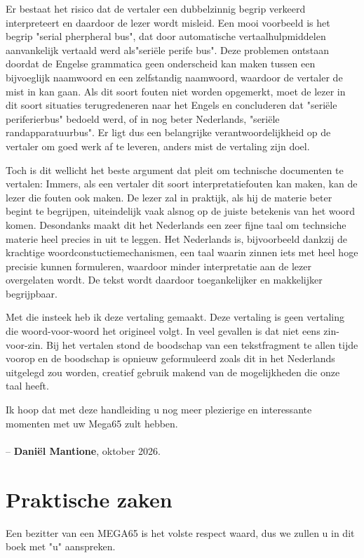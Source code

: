Er bestaat het risico dat de vertaler een dubbelzinnig begrip verkeerd interpreteert en daardoor de lezer wordt misleid.
Een mooi voorbeeld is het begrip "serial pherpheral bus", dat door automatische vertaalhulpmiddelen aanvankelijk vertaald
werd als"seriële perife bus". Deze problemen ontstaan doordat de Engelse grammatica geen onderscheid kan maken tussen een
bijvoeglijk naamwoord en een zelfstandig naamwoord, waardoor de vertaler de mist in kan gaan. Als dit soort fouten niet
worden opgemerkt, moet de lezer in dit soort situaties terugredeneren naar het Engels en concluderen dat "seriële
periferierbus" bedoeld werd, of in nog beter Nederlands, "seriële randapparatuurbus". Er ligt dus een belangrijke
verantwoordelijkheid op de vertaler om goed werk af te leveren, anders mist de vertaling zijn doel.

Toch is dit wellicht het beste argument dat pleit om technische documenten te vertalen: Immers, als een vertaler dit soort
interpretatiefouten kan maken, kan de lezer die fouten ook maken. De lezer zal in praktijk, als hij de materie beter begint
te begrijpen, uiteindelijk vaak alsnog op de juiste betekenis van het woord komen. Desondanks maakt dit het Nederlands een
zeer fijne taal om technsiche materie heel precies in uit te leggen. Het Nederlands is, bijvoorbeeld dankzij de krachtige
woordconstuctiemechanismen, een taal waarin zinnen iets met heel hoge precisie kunnen formuleren, waardoor minder interpretatie
aan de lezer overgelaten wordt. De tekst wordt daardoor toegankelijker en makkelijker begrijpbaar.

Met die insteek heb ik deze vertaling gemaakt. Deze vertaling is geen vertaling die woord-voor-woord het origineel volgt.
In veel gevallen is dat niet eens zin-voor-zin. Bij het vertalen stond de boodschap van een tekstfragment te allen tijde
voorop en de boodschap is opnieuw geformuleerd zoals dit in het Nederlands uitgelegd zou worden, creatief gebruik makend van
de mogelijkheden die onze taal heeft.

Ik hoop dat met deze handleiding u nog meer plezierige en interessante momenten met uw Mega65 zult hebben.
\\~\\
-- {\bf Daniël Mantione}, oktober 2026.

\section{Praktische zaken}

Een bezitter van een MEGA65 is het volste respect waard, dus we zullen u in dit boek met "u" aanspreken.

